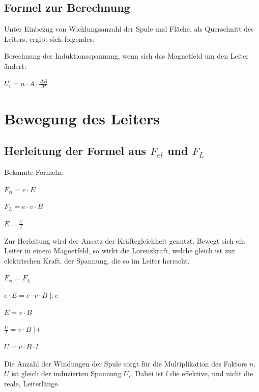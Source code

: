 \documentclass{article}
\begin{document}
\subsection*{Formel zur Berechnung}
Unter Einbezug von Wicklungsanzahl der Spule und Fläche, als Querschnitt des Leiters,
ergibt sich folgendes.
\newline

\normalsize
Berechnung der Induktionsspannung, wenn sich das Magnetfeld um den Leiter ändert:
\newline

\Large
$U_{i} = n \cdot A \cdot \frac{\Delta B}{\Delta t}$

\newpage

\section*{Bewegung des Leiters}

\subsection*{Herleitung der Formel aus $F_{el}$ und $F_{L}$}

Bekannte Formeln:
\newline

\Large
$F_{el} = e \cdot E$

$F_{L} = e \cdot v \cdot B$

$E = \frac{U}{l}$
\newline

\normalsize
Zur Herleitung wird der Ansatz der Kräftegleichheit genutzt.
Bewegt sich ein Leiter in einem Magnetfeld, so wirkt die Lorenzkraft, welche
gleich ist zur elektrischen Kraft, der Spannung, die so im Leiter herrscht.
\newline

\Large
$F_{el} = F_{L}$

$e \cdot E = e \cdot v \cdot B$ \hspace{0.25cm}$| :e$

$E = v \cdot B$

$\frac{U}{l} = v \cdot B$ \hspace{0.25cm}$| \cdot l $

$U = v \cdot B \cdot l$
\newline

\normalsize
Die Anzahl der Windungen der Spule sorgt für die Multiplikation des Faktors
$n$. $U$ ist gleich der induzierten Spannung $U_{i}$.
Dabei ist $l$ die effektive, und nicht die reale, Leiterlänge.
\newline
\end{document}
